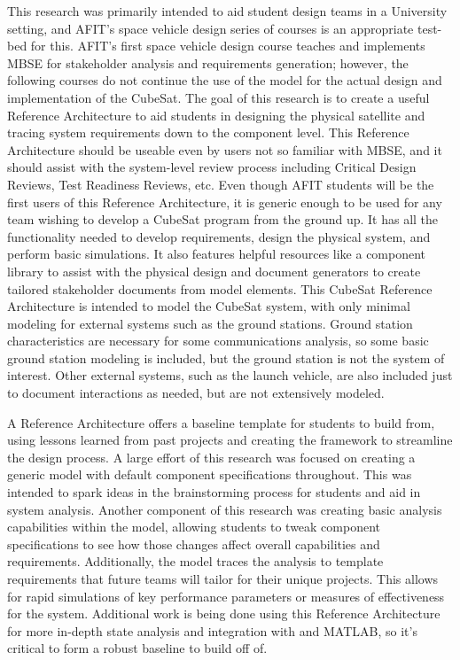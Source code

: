 This research was primarily intended to aid student design teams in a University setting, and AFIT's space vehicle design series of courses is an appropriate test-bed for this. AFIT's first space vehicle design course teaches and implements MBSE for stakeholder analysis and requirements generation; however, the following courses do not continue the use of the model for the actual design and implementation of the CubeSat. The goal of this research is to create a useful Reference Architecture to aid students in designing the physical satellite and tracing system requirements down to the component level. This Reference Architecture should be useable even by users not so familiar with MBSE, and it should assist with the system-level review process including Critical Design Reviews, Test Readiness Reviews, etc. Even though AFIT students will be the first users of this Reference Architecture, it is generic enough to be used for any team wishing to develop a CubeSat program from the ground up. It has all the functionality needed to develop requirements, design the physical system, and perform basic simulations. It also features helpful resources like a component library to assist with the physical design and document generators to create tailored stakeholder documents from model elements. This CubeSat Reference Architecture is intended to model the CubeSat system, with only minimal modeling for external systems such as the ground stations. Ground station characteristics are necessary for some communications analysis, so some basic ground station modeling is included, but the ground station is not the system of interest. Other external systems, such as the launch vehicle, are also included just to document interactions as needed, but are not extensively modeled.

A Reference Architecture offers a baseline template for students to build from, using lessons learned from past projects and creating the framework to streamline the design process. A large effort of this research was focused on creating a generic model with default component specifications throughout. This was intended to spark ideas in the brainstorming process for students and aid in system analysis. Another component of this research was creating basic analysis capabilities within the model, allowing students to tweak component specifications to see how those changes affect overall capabilities and requirements. Additionally, the model traces the analysis to template requirements that future teams will tailor for their unique projects. This allows for rapid simulations of key performance parameters or measures of effectiveness for the system. Additional work is being done using this Reference Architecture for more in-depth state analysis and integration with  and MATLAB, so it's critical to form a robust baseline to build off of.


